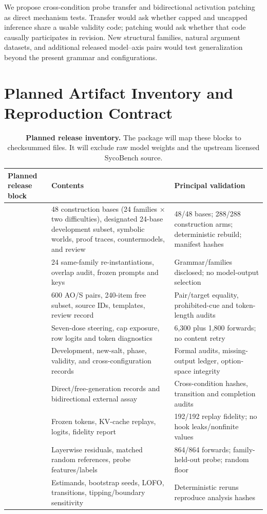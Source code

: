 \documentclass[letterpaper]{article}
\begin{document}
We propose cross-condition probe transfer and bidirectional activation patching as direct mechanism tests.  Transfer would ask whether capped and uncapped inference share a usable validity code; patching would ask whether that code causally participates in revision.  New structural families, natural argument datasets, and additional released model--axis pairs would test generalization beyond the present grammar and configurations.

\section{Planned Artifact Inventory and Reproduction Contract}
\label{supp:reproducibility}

\begin{table}[t]
\centering
\scriptsize
\setlength{\tabcolsep}{3pt}
\renewcommand{\arraystretch}{1.12}
\begin{tabularx}{\textwidth}{@{}L{3.2cm}YY@{}}
\toprule
Planned release block & Contents & Principal validation \\
\midrule
{} & 48 construction bases (24 families $\times$ two difficulties), designated 24-base development subset, symbolic worlds, proof traces, countermodels, and review & 48/48 bases; 288/288 construction arms; deterministic rebuild; manifest hashes \\
 & 24 same-family re-instantiations, overlap audit, frozen prompts and keys & Grammar/families disclosed; no model-output selection \\
 & 600 AO/S pairs, 240-item free subset, source IDs, templates, review record & Pair/target equality, prohibited-cue and token-length audits \\
 & Seven-dose steering, cap exposure, row logits and token diagnostics & 6,300 plus 1,800 forwards; no content retry \\
 & Development, new-salt, phase, validity, and cross-configuration records & Formal audits, missing-output ledger, option-space integrity \\
 & Direct/free-generation records and bidirectional external assay & Cross-condition hashes, transition and completion audits \\
 & Frozen tokens, KV-cache replays, logits, fidelity report & 192/192 replay fidelity; no hook leaks/nonfinite values \\
 & Layerwise residuals, matched random references, probe features/labels & 864/864 forwards; family-held-out probe; random floor \\
 & Estimands, bootstrap seeds, LOFO, transitions, tipping/boundary sensitivity & Deterministic reruns reproduce analysis hashes \\
\bottomrule
\end{tabularx}
\caption{\textbf{Planned release inventory.} The package will map these blocks to checksummed files.  It will exclude raw model weights and the upstream licensed SycoBench source.}
\label{tab:supp-artifacts}
\end{table}
\end{document}
